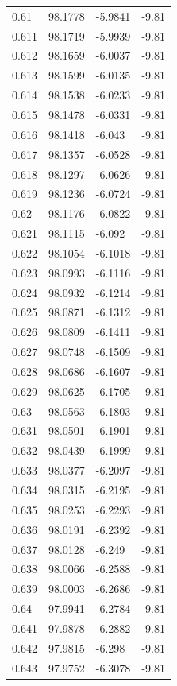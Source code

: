 \begin{tabular}{llll}
0.61 & 98.1778 & -5.9841 & -9.81 \\
0.611 & 98.1719 & -5.9939 & -9.81 \\
0.612 & 98.1659 & -6.0037 & -9.81 \\
0.613 & 98.1599 & -6.0135 & -9.81 \\
0.614 & 98.1538 & -6.0233 & -9.81 \\
0.615 & 98.1478 & -6.0331 & -9.81 \\
0.616 & 98.1418 & -6.043 & -9.81 \\
0.617 & 98.1357 & -6.0528 & -9.81 \\
0.618 & 98.1297 & -6.0626 & -9.81 \\
0.619 & 98.1236 & -6.0724 & -9.81 \\
0.62 & 98.1176 & -6.0822 & -9.81 \\
0.621 & 98.1115 & -6.092 & -9.81 \\
0.622 & 98.1054 & -6.1018 & -9.81 \\
0.623 & 98.0993 & -6.1116 & -9.81 \\
0.624 & 98.0932 & -6.1214 & -9.81 \\
0.625 & 98.0871 & -6.1312 & -9.81 \\
0.626 & 98.0809 & -6.1411 & -9.81 \\
0.627 & 98.0748 & -6.1509 & -9.81 \\
0.628 & 98.0686 & -6.1607 & -9.81 \\
0.629 & 98.0625 & -6.1705 & -9.81 \\
0.63 & 98.0563 & -6.1803 & -9.81 \\
0.631 & 98.0501 & -6.1901 & -9.81 \\
0.632 & 98.0439 & -6.1999 & -9.81 \\
0.633 & 98.0377 & -6.2097 & -9.81 \\
0.634 & 98.0315 & -6.2195 & -9.81 \\
0.635 & 98.0253 & -6.2293 & -9.81 \\
0.636 & 98.0191 & -6.2392 & -9.81 \\
0.637 & 98.0128 & -6.249 & -9.81 \\
0.638 & 98.0066 & -6.2588 & -9.81 \\
0.639 & 98.0003 & -6.2686 & -9.81 \\
0.64 & 97.9941 & -6.2784 & -9.81 \\
0.641 & 97.9878 & -6.2882 & -9.81 \\
0.642 & 97.9815 & -6.298 & -9.81 \\
0.643 & 97.9752 & -6.3078 & -9.81 \\

\end{tabular}
